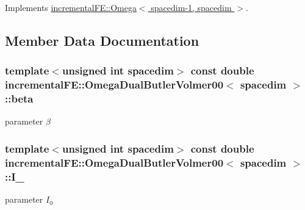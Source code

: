Implements \hyperlink{classincremental_f_e_1_1_omega_a2f35d862aefa11151de5b7c7411e45df}{incremental\+F\+E\+::\+Omega$<$ spacedim-\/1, spacedim $>$}.



\subsection{Member Data Documentation}
\subsubsection[{\texorpdfstring{beta}{beta}}]{\setlength{\rightskip}{0pt plus 5cm}template$<$unsigned int spacedim$>$ const double {\bf incremental\+F\+E\+::\+Omega\+Dual\+Butler\+Volmer00}$<$ spacedim $>$\+::beta\hspace{0.3cm}{\ttfamily [private]}}\hypertarget{classincremental_f_e_1_1_omega_dual_butler_volmer00_a8823655ea8aa9eb5668a64c6ee7bf4be}{}\label{classincremental_f_e_1_1_omega_dual_butler_volmer00_a8823655ea8aa9eb5668a64c6ee7bf4be}
parameter $\beta$ 
\subsubsection[{\texorpdfstring{I\+\_\+0}{I_0}}]{\setlength{\rightskip}{0pt plus 5cm}template$<$unsigned int spacedim$>$ const double {\bf incremental\+F\+E\+::\+Omega\+Dual\+Butler\+Volmer00}$<$ spacedim $>$\+::I\+\_\hspace{0.3cm}{\ttfamily [private]}}\hypertarget{classincremental_f_e_1_1_omega_dual_butler_volmer00_a37608eb032b6e88dd8c9a7d0f553a0bd}{}\label{classincremental_f_e_1_1_omega_dual_butler_volmer00_a37608eb032b6e88dd8c9a7d0f553a0bd}
parameter $I_0$ 

